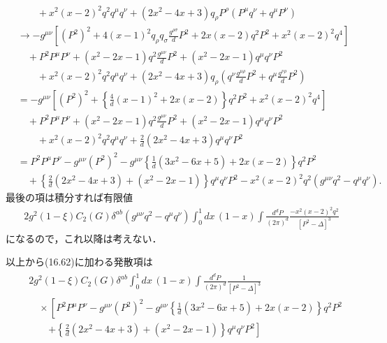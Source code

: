 \begin{align*}
  &\qquad + x^2 (x-2)^2 q^2 q^\mu q^\nu + (2x^2-4x+3) q_\rho P^\rho (P^\mu q^\nu + q^\mu P^\nu) \\
  &\to - g^{\mu\nu} \left[ (P^2)^2 + 4(x-1)^2 q_\rho q_\sigma \frac{g^{\rho\sigma}}{d} P^2 + 2x(x-2) q^2 P^2 + x^2(x-2)^2 q^4 \right] \\
  &\quad + P^2 P^\mu P^\nu + (x^2-2x-1) q^2 \frac{g^{\mu\nu}}{d} P^2 + (x^2-2x-1) q^\mu q^\nu P^2 \\
  &\qquad + x^2 (x-2)^2 q^2 q^\mu q^\nu + (2x^2-4x+3) q_\rho \left( q^\nu \frac{g^{\mu\rho}}{d} P^2 + q^\mu \frac{g^{\nu\rho}}{d} P^2 \right) \\
  &= - g^{\mu\nu} \left[ (P^2)^2 + \left\{ \frac{4}{d}(x-1)^2 + 2x(x-2) \right\} q^2 P^2 + x^2(x-2)^2 q^4 \right] \\
  &\quad + P^2 P^\mu P^\nu + (x^2-2x-1) q^2 \frac{g^{\mu\nu}}{d} P^2 + (x^2-2x-1) q^\mu q^\nu P^2 \\
  &\qquad + x^2 (x-2)^2 q^2 q^\mu q^\nu + \frac{2}{d} (2x^2-4x+3) q^\mu q^\nu P^2 \\
  &= P^2 P^\mu P^\nu - g^{\mu\nu} (P^2)^2 - g^{\mu\nu} \left\{ \frac{1}{d}(3x^2-6x+5) + 2x(x-2) \right\} q^2 P^2 \\
  & \quad + \left\{ \frac{2}{d} (2x^2-4x+3) + (x^2-2x-1) \right\} q^\mu q^\nu P^2 - x^2(x-2)^2 q^2 (g^{\mu\nu}q^2 - q^\mu q^\nu) .
\end{align*}
最後の項は積分すれば有限値
\begin{align}
  2 g^2 (1-\xi) C_2(G) \delta^{ab} (g^{\mu\nu}q^2 - q^\mu q^\nu) \int_0^1 dx \, (1-x) \int \frac{d^dP}{(2\pi)^d} \frac{- x^2(x-2)^2 q^2}{[P^2-\Delta]^3}
\end{align}
になるので，これ以降は考えない．

以上から(16.62)に加わる発散項は
\begin{align}
  \begin{split}
    & 2 g^2 (1-\xi) C_2(G) \delta^{ab} \int_0^1 dx \,(1-x) \int \frac{d^dP}{(2\pi)^d} \frac{1}{[P^2-\Delta]^3} \\
    &\quad \times \left[ P^2 P^\mu P^\nu - g^{\mu\nu} (P^2)^2 - g^{\mu\nu} \left\{ \frac{1}{d}(3x^2-6x+5) + 2x(x-2) \right\} q^2 P^2 \right. \\
    &\qquad \left. + \left\{ \frac{2}{d} (2x^2-4x+3)+ (x^2-2x-1) \right\} q^\mu q^\nu P^2 \right]
   \end{split}
   \label{eq_17_72_modify_16_62_second_third_term_except_last}
\end{align}

